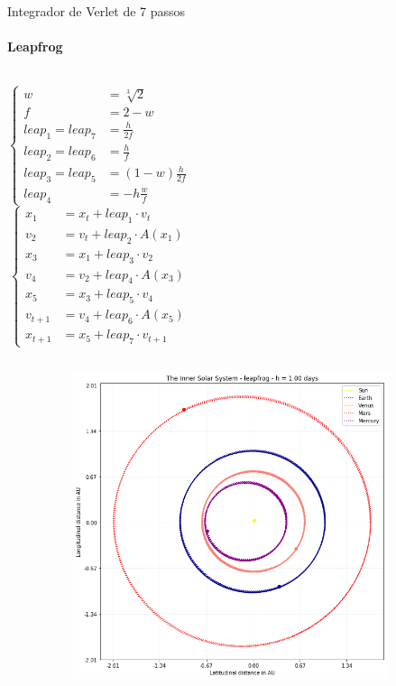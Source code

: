 \documentclass{beamer}
\begin{document}
    \begin{frame}{Integrador de Verlet de 7 passos}
      \framesubtitle{Leapfrog}%
      \begin{columns}[onlytextwidth]
      \[
      \begin{cases}
        w &= \sqrt[3]{2}\\
        f &= 2 - w\\
        leap_1 = leap_7 &= \frac{h}{2f}\\
        leap_2 = leap_6 &= \frac{h}{f}\\
        leap_3 = leap_5 &= (1-w) \frac{h}{2f}\\
        leap_4 &= -h \frac{w}{f}
      \end{cases}
      \]
      \[
      \begin{cases}
      x_{1} &= x_t + leap_1 \cdot v_t\\
      v_{2} &= v_t + leap_2 \cdot A(x_{1})\\
      x_{3} &= x_{1} + leap_3 \cdot v_{2}\\
      v_{4} &= v_{2} + leap_4 \cdot A(x_{3})\\
      x_{5} &= x_{3} + leap_5 \cdot v_{4}\\
      v_{t+1} &= v_{4} + leap_6 \cdot A(x_{5})\\
      x_{t+1} &= x_{5} + leap_7 \cdot v_{t+1}
    \end{cases}
    \]
    \end{columns}
    \end{frame}

    \begin{frame}
      \begin{figure}[h]
        \vspace{-0.5cm}
        \includegraphics[width=110mm, height = 90mm]{resources/leap1.png}
      \end{figure}
    \end{frame}
\end{document}

